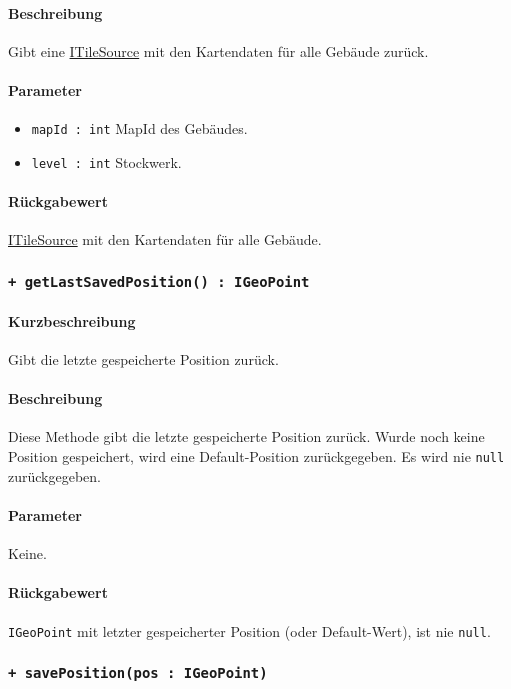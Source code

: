 \paragraph*{Beschreibung}
Gibt eine \href{https://osmdroid.github.io/osmdroid/javadocAll/org/osmdroid/tileprovider/tilesource/ITileSource.html}
{ITileSource} mit den Kartendaten für alle Gebäude zurück.
\paragraph*{Parameter}
\begin{itemize}
    \item \texttt{mapId : int} MapId des Gebäudes.
    \item \texttt{level : int} Stockwerk.
\end{itemize}
\paragraph*{Rückgabewert}
\href{https://osmdroid.github.io/osmdroid/javadocAll/org/osmdroid/tileprovider/tilesource/ITileSource.html}
{ITileSource} mit den Kartendaten für alle Gebäude.

\subsubsection*{\texttt{+ getLastSavedPosition() : IGeoPoint}}%
\paragraph*{Kurzbeschreibung}
Gibt die letzte gespeicherte Position zurück.
\paragraph*{Beschreibung}
Diese Methode gibt die letzte gespeicherte Position zurück. Wurde noch keine Position gespeichert,
wird eine Default-Position zurückgegeben. Es wird nie \texttt{null} zurückgegeben.
\paragraph*{Parameter}
Keine.
\paragraph*{Rückgabewert}
\texttt{IGeoPoint} mit letzter gespeicherter Position (oder Default-Wert), ist nie \texttt{null}.

\subsubsection*{\texttt{+ savePosition(pos : IGeoPoint)}}%
